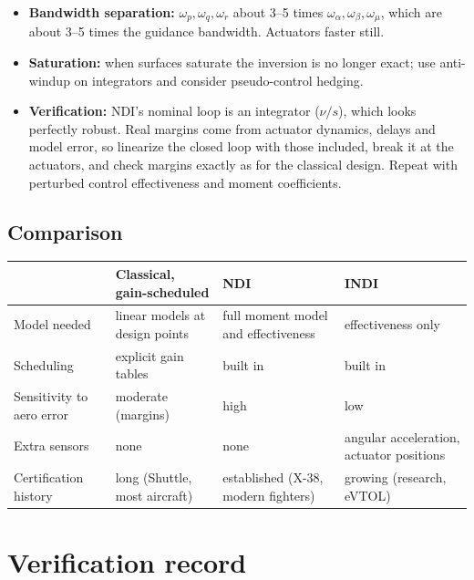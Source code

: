 \documentclass[11pt]{report}
\numberwithin{equation}{chapter}
\begin{document}
\begin{itemize}
\item \textbf{Bandwidth separation:} $\omega_p,\omega_q,\omega_r$ about 3--5 times
  $\omega_\alpha,\omega_\beta,\omega_\mu$, which are about 3--5 times the guidance
  bandwidth. Actuators faster still.
\item \textbf{Saturation:} when surfaces saturate the inversion is no longer exact; use
  anti-windup on integrators and consider pseudo-control hedging.
\item \textbf{Verification:} NDI's nominal loop is an integrator ($\nu/s$), which looks
  perfectly robust. Real margins come from actuator dynamics, delays and model error, so
  linearize the closed loop with those included, break it at the actuators, and check
  margins exactly as for the classical design. Repeat with perturbed control effectiveness and
  moment coefficients.
\end{itemize}

\section{Comparison}

\begin{center}
\renewcommand{\arraystretch}{1.3}
\begin{tabular}{@{}>{\raggedright\arraybackslash}p{}>{\raggedright\arraybackslash}p{}>{\raggedright\arraybackslash}p{}>{\raggedright\arraybackslash}p{}@{}}
\toprule
& Classical, gain-scheduled & NDI & INDI \\
\midrule
Model needed & linear models at design points & full moment model and effectiveness & effectiveness only \\
Scheduling & explicit gain tables & built in & built in \\
Sensitivity to aero error & moderate (margins) & high & low \\
Extra sensors & none & none & angular acceleration, actuator positions \\
Certification history & long (Shuttle, most aircraft) & established (X-38, modern fighters) & growing (research, eVTOL) \\
\bottomrule
\end{tabular}
\end{center}

\appendix
\chapter{Verification record}\label{app:verify}
\end{document}
